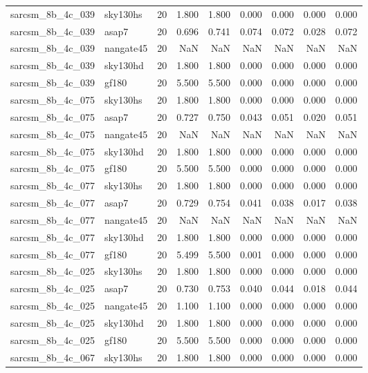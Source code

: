 \begin{tabular}{llrrrrrrr}
sarcsm\_8b\_4c\_039 & sky130hs & 20 & 1.800 & 1.800 & 0.000 & 0.000 & 0.000 & 0.000 \\
sarcsm\_8b\_4c\_039 & asap7 & 20 & 0.696 & 0.741 & 0.074 & 0.072 & 0.028 & 0.072 \\
sarcsm\_8b\_4c\_039 & nangate45 & 20 & NaN & NaN & NaN & NaN & NaN & NaN \\
sarcsm\_8b\_4c\_039 & sky130hd & 20 & 1.800 & 1.800 & 0.000 & 0.000 & 0.000 & 0.000 \\
sarcsm\_8b\_4c\_039 & gf180 & 20 & 5.500 & 5.500 & 0.000 & 0.000 & 0.000 & 0.000 \\
sarcsm\_8b\_4c\_075 & sky130hs & 20 & 1.800 & 1.800 & 0.000 & 0.000 & 0.000 & 0.000 \\
sarcsm\_8b\_4c\_075 & asap7 & 20 & 0.727 & 0.750 & 0.043 & 0.051 & 0.020 & 0.051 \\
sarcsm\_8b\_4c\_075 & nangate45 & 20 & NaN & NaN & NaN & NaN & NaN & NaN \\
sarcsm\_8b\_4c\_075 & sky130hd & 20 & 1.800 & 1.800 & 0.000 & 0.000 & 0.000 & 0.000 \\
sarcsm\_8b\_4c\_075 & gf180 & 20 & 5.500 & 5.500 & 0.000 & 0.000 & 0.000 & 0.000 \\
sarcsm\_8b\_4c\_077 & sky130hs & 20 & 1.800 & 1.800 & 0.000 & 0.000 & 0.000 & 0.000 \\
sarcsm\_8b\_4c\_077 & asap7 & 20 & 0.729 & 0.754 & 0.041 & 0.038 & 0.017 & 0.038 \\
sarcsm\_8b\_4c\_077 & nangate45 & 20 & NaN & NaN & NaN & NaN & NaN & NaN \\
sarcsm\_8b\_4c\_077 & sky130hd & 20 & 1.800 & 1.800 & 0.000 & 0.000 & 0.000 & 0.000 \\
sarcsm\_8b\_4c\_077 & gf180 & 20 & 5.499 & 5.500 & 0.001 & 0.000 & 0.000 & 0.000 \\
sarcsm\_8b\_4c\_025 & sky130hs & 20 & 1.800 & 1.800 & 0.000 & 0.000 & 0.000 & 0.000 \\
sarcsm\_8b\_4c\_025 & asap7 & 20 & 0.730 & 0.753 & 0.040 & 0.044 & 0.018 & 0.044 \\
sarcsm\_8b\_4c\_025 & nangate45 & 20 & 1.100 & 1.100 & 0.000 & 0.000 & 0.000 & 0.000 \\
sarcsm\_8b\_4c\_025 & sky130hd & 20 & 1.800 & 1.800 & 0.000 & 0.000 & 0.000 & 0.000 \\
sarcsm\_8b\_4c\_025 & gf180 & 20 & 5.500 & 5.500 & 0.000 & 0.000 & 0.000 & 0.000 \\
sarcsm\_8b\_4c\_067 & sky130hs & 20 & 1.800 & 1.800 & 0.000 & 0.000 & 0.000 & 0.000 \\

\end{tabular}
